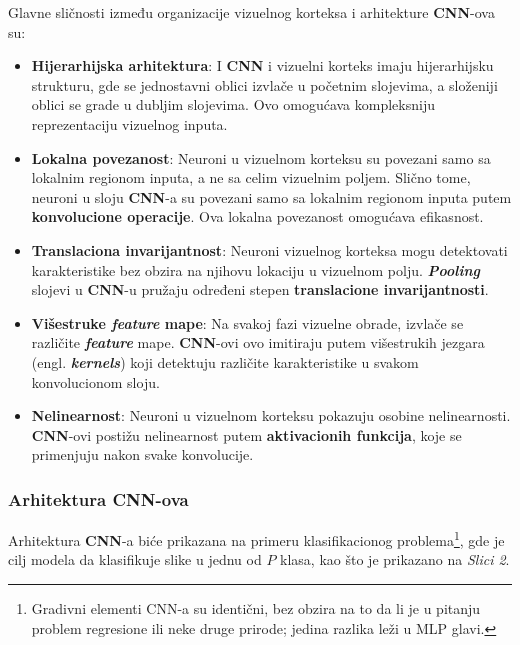 \documentclass[12pt]{article}
\begin{document}
   Glavne sličnosti \cite{human_visual_cortex} između organizacije vizuelnog korteksa i arhitekture \textbf{CNN}-ova su:
   \begin{itemize}
   \item \textbf{Hijerarhijska arhitektura}: I \textbf{CNN} i vizuelni korteks imaju hijerarhijsku strukturu, 
   gde se jednostavni oblici izvlače u početnim slojevima, a složeniji oblici se grade u dubljim slojevima. 
   Ovo omogućava kompleksniju reprezentaciju vizuelnog inputa.
   \item \textbf{Lokalna povezanost}: Neuroni u vizuelnom korteksu su povezani samo sa 
   lokalnim regionom inputa, a ne sa celim vizuelnim poljem. Slično tome, neuroni 
   u sloju \textbf{CNN}-a su povezani samo sa lokalnim regionom inputa putem \textbf{konvolucione operacije}. 
   Ova lokalna povezanost omogućava efikasnost.
   \item \textbf{Translaciona invarijantnost}: Neuroni vizuelnog korteksa mogu detektovati karakteristike
    bez obzira na njihovu lokaciju u vizuelnom polju. \textbf{\textit{Pooling}} slojevi u \textbf{CNN}-u pružaju određeni 
    stepen \textbf{translacione invarijantnosti}.
    \item \textbf{Višestruke \textit{feature} mape}: Na svakoj fazi vizuelne obrade, izvlače se različite \textbf{\textit{feature}} mape.
    \textbf{CNN}-ovi ovo imitiraju putem višestrukih jezgara (engl. \textbf{\textit{kernels}}) koji detektuju različite karakteristike
      u svakom konvolucionom sloju.
   \item \textbf{Nelinearnost}: Neuroni u vizuelnom korteksu pokazuju osobine nelinearnosti. 
   \textbf{CNN}-ovi postižu nelinearnost putem \textbf{aktivacionih funkcija}, koje se primenjuju nakon svake konvolucije.
   
   \end{itemize}
   
   \newpage

   \subsubsection{Arhitektura CNN-ova}
   Arhitektura \textbf{CNN}-a biće prikazana na primeru klasifikacionog
    problema\footnote{Gradivni elementi CNN-a su identični, bez obzira na to
     da li je u pitanju problem regresione ili neke druge prirode; jedina razlika leži u MLP glavi.}, 
     gde je cilj modela da klasifikuje slike u jednu od $P$ klasa, kao što je prikazano na \textit{Slici 2}.
\end{document}
